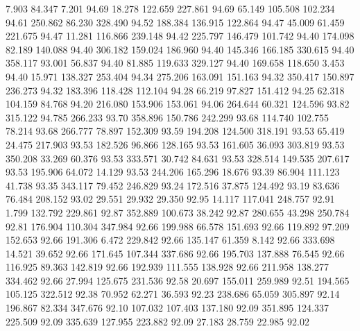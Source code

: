    7.903   84.347    7.201        94.69
  18.278  122.659  227.861        94.69
  65.149  105.508  102.234        94.61
 250.862   86.230  328.490        94.52
 188.384  136.915  122.864        94.47
  45.009   61.459  221.675        94.47
  11.281  116.866  239.148        94.42
 225.797  146.479  101.742        94.40
 174.098   82.189  140.088        94.40
 306.182  159.024  186.960        94.40
 145.346  166.185  330.615        94.40
 358.117   93.001   56.837        94.40
  81.885  119.633  329.127        94.40
 169.658  118.650    3.453        94.40
  15.971  138.327  253.404        94.34
 275.206  163.091  151.163        94.32
 350.417  150.897  236.273        94.32
 183.396  118.428  112.104        94.28
  66.219   97.827  151.412        94.25
  62.318  104.159   84.768        94.20
 216.080  153.906  153.061        94.06
 264.644   60.321  124.596        93.82
 315.122   94.785  266.233        93.70
 358.896  150.786  242.299        93.68
 114.740  102.755   78.214        93.68
 266.777   78.897  152.309        93.59
 194.208  124.500  318.191        93.53
  65.419   24.475  217.903        93.53
 182.526   96.866  128.165        93.53
 161.605   36.093  303.819        93.53
 350.208   33.269   60.376        93.53
 333.571   30.742   84.631        93.53
 328.514  149.535  207.617        93.53
 195.906   64.072   14.129        93.53
 244.206  165.296   18.676        93.39
  86.904  111.123   41.738        93.35
 343.117   79.452  246.829        93.24
 172.516   37.875  124.492        93.19
  83.636   76.484  208.152        93.02
  29.551   29.932   29.350        92.95
  14.117  117.041  248.757        92.91
   1.799  132.792  229.861        92.87
 352.889  100.673   38.242        92.87
 280.655   43.298  250.784        92.81
 176.904  110.304  347.984        92.66
 199.988   66.578  151.693        92.66
 119.892   97.209  152.653        92.66
 191.306    6.472  229.842        92.66
 135.147   61.359    8.142        92.66
 333.698   14.521   39.652        92.66
 171.645  107.344  337.686        92.66
 195.703  137.888   76.545        92.66
 116.925   89.363  142.819        92.66
 192.939  111.555  138.928        92.66
 211.958  138.277  334.462        92.66
  27.994  125.675  231.536        92.58
  20.697  155.011  259.989        92.51
 194.565  105.125  322.512        92.38
  70.952   62.271   36.593        92.23
 238.686   65.059  305.897        92.14
 196.867   82.334  347.676        92.10
 107.032  107.403  137.180        92.09
 351.895  124.337  225.509        92.09
 335.639  127.955  223.882        92.09
  27.183   28.759   22.985        92.02

